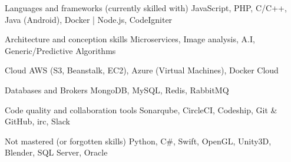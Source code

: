 

\begin{cvskills}

  \cvskill
    {Languages and frameworks (currently skilled with)} %
    {JavaScript, PHP, C/C++, Java (Android), Docker | Node.js, CodeIgniter} %

  \cvskill
    {Architecture and conception skills} %
    {Microservices, Image analysis, A.I, Generic/Predictive Algorithms} %

  \cvskill
    {Cloud} %
    {AWS (S3, Beanstalk, EC2), Azure (Virtual Machines), Docker Cloud} %

  \cvskill
    {Databases and Brokers} %
    {MongoDB, MySQL, Redis, RabbitMQ} %

  \cvskill
    {Code quality and collaboration tools} %
    {Sonarqube, CircleCI, Codeship, Git \& GitHub, irc, Slack} %

  \cvskill
    {Not mastered (or forgotten skills)} %
    {Python, C\#, Swift, OpenGL, Unity3D, Blender, SQL Server, Oracle} %

\end{cvskills}
